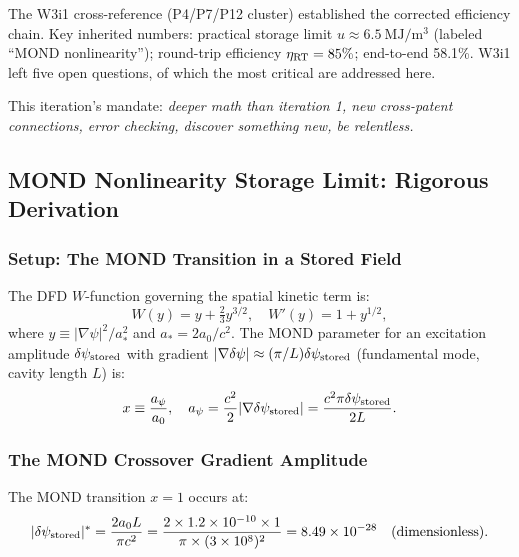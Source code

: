 \documentclass[aps,prd,twocolumn,superscriptaddress]{revtex4-2}
\newcommand{\deltapsi}{\delta\psi}
\newcommand{\astar}{a_*}
\newcommand{\azero}{a_0}
\begin{document}
The W3i1 cross-reference (P4/P7/P12 cluster) established the corrected
efficiency chain.  Key inherited numbers: practical storage limit
$u \approx 6.5~\mathrm{MJ/m^3}$ (labeled ``MOND nonlinearity'');
round-trip efficiency $\eta_{\rm RT} = 85\%$; end-to-end 58.1\%.  W3i1
left five open questions, of which the most critical are addressed here.

This iteration's mandate: \emph{deeper math than iteration 1, new
cross-patent connections, error checking, discover something new, be relentless.}

\subsection{MOND Nonlinearity Storage Limit: Rigorous Derivation}
\label{sec:mond-limit}

\subsubsection{Setup: The MOND Transition in a Stored Field}

The DFD $W$-function governing the spatial kinetic term is:
\begin{equation}
W(y) = y + \tfrac{2}{3}y^{3/2},\quad W'(y) = 1 + y^{1/2},
\end{equation}
where $y \equiv |\nabla\psi|^2/\astar^2$ and $\astar = 2\azero/c^2$.
The MOND parameter for an excitation amplitude $\deltapsi_{\rm stored}$
with gradient $|\nabla\deltapsi| \approx (\pi/L)\deltapsi_{\rm stored}$
(fundamental mode, cavity length $L$) is:
\begin{equation}
x \equiv \frac{a_\psi}{\azero},\quad
a_\psi = \frac{c^2}{2}|\nabla\deltapsi_{\rm stored}|
= \frac{c^2\pi\deltapsi_{\rm stored}}{2L}.
\end{equation}

\subsubsection{The MOND Crossover Gradient Amplitude}

The MOND transition $x = 1$ occurs at:
\begin{equation}
|\deltapsi_{\rm stored}|^* = \frac{2\azero L}{\pi c^2}
= \frac{2\times 1.2\times 10^{-10}\times 1}{\pi\times(3\times 10^8)^2}
= 8.49\times 10^{-28}\quad(\text{dimensionless}).
\end{equation}
\end{document}
